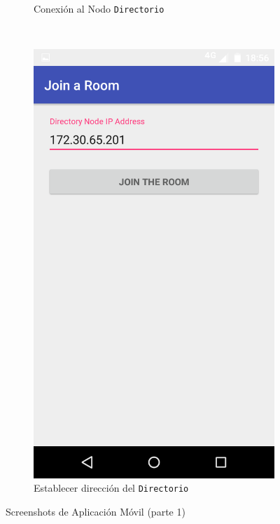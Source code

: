 \begin{figure}[H]
\begin{subfigure}[b]{0.4\textwidth}
        \caption{Conexión al Nodo \texttt{Directorio}}
        \label{fig:mobile_connect}
    \end{subfigure}
    ~
    \begin{subfigure}[b]{0.4\textwidth}
        \includegraphics[width=\textwidth]{imagenes/mobile_connect.png}
        \caption{Establecer dirección del \texttt{Directorio}}
        \label{fig:mobile_set_ip}
    \end{subfigure}
    \caption{Screenshots de Aplicación Móvil (parte 1)}
    \label{fig:mobile_screenshots_1}
\end{figure}

